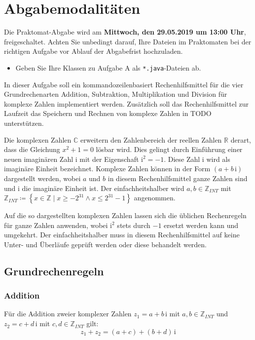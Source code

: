 \documentclass{sdqassignment}
\begin{document}

\section*{Abgabemodalitäten}

Die Praktomat-Abgabe wird am \textbf{Mittwoch, den 29.05.2019 um 13:00 Uhr}, freigeschaltet. Achten Sie unbedingt darauf, Ihre Dateien im Praktomaten bei der richtigen Aufgabe vor Ablauf der Abgabefrist hochzuladen.

\begin{itemize}
    \item Geben Sie Ihre Klassen zu Aufgabe A als \texttt{*.java}-Dateien ab.
\end{itemize}

\newpage

In dieser Aufgabe soll ein kommandozeilenbasiert Rechenhilfsmittel für die vier Grundrechenarten Addition, Subtraktion, Multiplikation und Division für komplexe Zahlen implementiert werden. Zusätzlich soll das Rechenhilfsmittel zur Laufzeit das Speichern und Rechnen von komplexe Zahlen in TODO unterstützen.

Die komplexen Zahlen \(\mathbb{C}\) erweitern den Zahlenbereich der reellen Zahlen \(\mathbb{R}\) derart, dass die Gleichung \(x^{2}+1=0\) lösbar wird. Dies gelingt durch Einführung einer neuen imaginären Zahl \(\mathrm{i}\) mit der Eigenschaft \(\mathrm{i}^{2}=-1\). Diese Zahl \(\mathrm{i}\) wird als imaginäre Einheit bezeichnet. Komplexe Zahlen können in der Form \(\left(a+b\,\mathrm{i}\right)\) dargestellt werden, wobei \(a\) und \(b\) in diesem Rechenhilfsmittel ganze Zahlen sind und \(\mathrm{i}\) die imaginäre Einheit ist. Der einfachheitshalber wird \(a,b\in\mathbb{Z}_{INT}\) mit \(\mathbb{Z}_{INT}\coloneqq\left\{x\in\mathbb{Z}\mid x\geq-2^{31}\land x\leq2^{31}-1\right\}\) angenommen.

Auf die so dargestellten komplexen Zahlen lassen sich die üblichen Rechenregeln für ganze Zahlen anwenden, wobei \(\mathrm{i}^{2}\) stets durch \(-1\) ersetzt werden kann und umgekehrt. Der einfachheitshalber muss in diesem Rechenhilfsmittel auf keine Unter- und Überläufe geprüft werden oder diese behandelt werden.

\subsection{Grundrechenregeln}
\subsubsection{Addition \lstinlinetxt{+}}
Für die Addition zweier komplexer Zahlen \(z_{1}=a+b\,\mathrm{i}\) mit \(a,b\in\mathbb{Z}_{INT}\) und \(z_{2}=c+d\,\mathrm{i}\) mit \(c,d\in\mathbb{Z}_{INT}\) gilt: \[z_{1}+z_{2}=(a+c)+(b+d)\,\mathrm{i}\]
\end{document}
